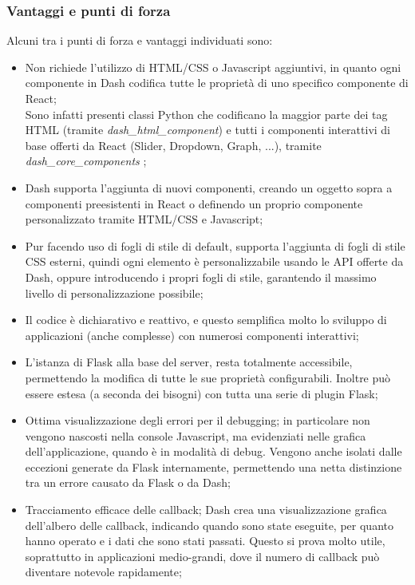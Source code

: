 \subsubsection{Vantaggi e punti di forza}
Alcuni tra i punti di forza e vantaggi individuati sono:
\begin{itemize}
\item Non richiede l'utilizzo di HTML/CSS o Javascript aggiuntivi, in quanto ogni componente in Dash codifica tutte le proprietà di uno specifico componente di React;
\\
Sono infatti presenti classi Python che codificano la maggior parte dei tag HTML (tramite \textit{dash\_html\_component}) e tutti i componenti interattivi di base offerti da React (Slider, Dropdown, Graph, ...), tramite \textit{dash\_core\_components} \cite{site:dash-core-comp};

\item Dash supporta l'aggiunta di nuovi componenti, creando un oggetto sopra a componenti preesistenti in React o definendo un proprio componente personalizzato tramite HTML/CSS e Javascript;

\item Pur facendo uso di fogli di stile di default, supporta l'aggiunta di fogli di stile CSS esterni, quindi ogni elemento è personalizzabile usando le \gls{API} offerte da Dash, oppure introducendo i propri fogli di stile, garantendo il massimo livello di personalizzazione possibile;

\item Il codice è dichiarativo e reattivo, e questo semplifica molto lo sviluppo di applicazioni (anche complesse) con numerosi componenti interattivi;

\item L'istanza di Flask alla base del server, resta totalmente accessibile, permettendo la modifica di tutte le sue proprietà configurabili. Inoltre può essere estesa (a seconda dei bisogni) con tutta una serie di plugin Flask;

\item Ottima visualizzazione degli errori per il debugging; in particolare non vengono nascosti nella console Javascript, ma evidenziati nelle grafica dell'applicazione, quando è in modalità di debug. Vengono anche isolati dalle eccezioni generate da Flask internamente, permettendo una netta distinzione tra un errore causato da Flask o da Dash;

\item Tracciamento efficace delle callback; Dash crea una visualizzazione grafica dell'albero delle callback, indicando quando sono state eseguite, per quanto hanno operato e i dati che sono stati passati.
Questo si prova molto utile, soprattutto in applicazioni medio-grandi, dove il numero di callback può diventare notevole rapidamente;


\end{itemize}
